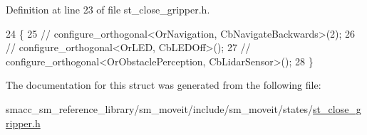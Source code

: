 Definition at line 23 of file st\+\_\+close\+\_\+gripper.\+h.


\begin{DoxyCode}
24    \{
25       \textcolor{comment}{//   configure\_orthogonal<OrNavigation, CbNavigateBackwards>(2);}
26       \textcolor{comment}{//   configure\_orthogonal<OrLED, CbLEDOff>();}
27       \textcolor{comment}{//   configure\_orthogonal<OrObstaclePerception, CbLidarSensor>();}
28    \}
\end{DoxyCode}


The documentation for this struct was generated from the following file\+:\begin{DoxyCompactItemize}
\item 
smacc\+\_\+sm\+\_\+reference\+\_\+library/sm\+\_\+moveit/include/sm\+\_\+moveit/states/\hyperlink{sm__moveit_2include_2sm__moveit_2states_2st__close__gripper_8h}{st\+\_\+close\+\_\+gripper.\+h}\end{DoxyCompactItemize}
